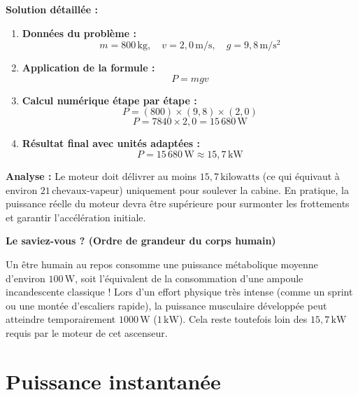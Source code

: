 \documentclass[11pt,openany]{book}
\begin{document}
\noindent\textbf{Solution détaillée :}

\begin{enumerate}
    \item \textbf{Données du problème :}
    \[
    m = \mathrm{800\,kg}, \quad v = \mathrm{2{,}0\,m/s}, \quad g = \mathrm{9{,}8\,m/s^2}
    \]

    \item \textbf{Application de la formule :}
    \[
    P = mgv
    \]

    \item \textbf{Calcul numérique étape par étape :}
    \[
    P = (800) \times (9{,}8) \times (2{,}0)
    \]
    \[
    P = 7840 \times 2{,}0 = 15\,680\,\mathrm{W}
    \]

    \item \textbf{Résultat final avec unités adaptées :}
    \[
    \boxed{P = \mathrm{15\,680\,W} \approx \mathrm{15{,}7\,kW}}
    \]
\end{enumerate}

\noindent\textbf{Analyse :} Le moteur doit délivrer au moins $15{,}7\,\text{kilowatts}$ (ce qui équivaut à environ $21\,\text{chevaux-vapeur}$) uniquement pour soulever la cabine. En pratique, la puissance réelle du moteur devra être supérieure pour surmonter les frottements et garantir l'accélération initiale.

\vspace{0.4cm}

\noindent\textbf{Le saviez-vous ? (Ordre de grandeur du corps humain)}

\vspace{0.1cm}

\noindent Un être humain au repos consomme une puissance métabolique moyenne d'environ $\mathrm{100\,W}$, soit l'équivalent de la consommation d'une ampoule incandescente classique ! Lors d'un effort physique très intense (comme un sprint ou une montée d'escaliers rapide), la puissance musculaire développée peut atteindre temporairement $\mathrm{1000\,W}$ ($\mathrm{1\,kW}$). Cela reste toutefois loin des $\mathrm{15{,}7\,kW}$ requis par le moteur de cet ascenseur.

\section{Puissance instantanée}
\end{document}
